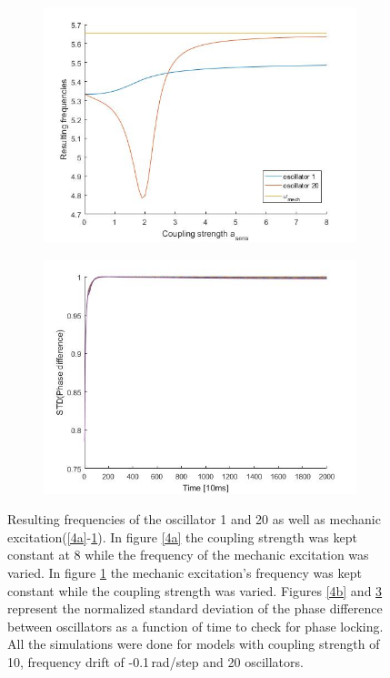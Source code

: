 \documentclass[a4paper]{scrartcl}
\begin{document}
\begin{figure}[t]
\begin{subfigure}[b]{0.49\textwidth}
		\includegraphics[width=\textwidth]{results/6.c/Freq_O_const.jpg}
		\caption{}\label{4c}
	\end{subfigure}
	\centering
	\begin{subfigure}[b]{0.49\textwidth}
		\centering
		\includegraphics[width=\textwidth]{results/6.c/Phase_O_const.jpg}
		\caption{}\label{4d}
	\end{subfigure}
	\caption{Resulting frequencies of the oscillator 1 and 20 as well as mechanic excitation(\ref{4a}-\ref{4c}). In figure \ref{4a} the coupling strength was kept constant at 8 while the frequency of the mechanic excitation was varied. In figure \ref{4c} the mechanic excitation's frequency was kept constant while the coupling strength was varied. Figures \ref{4b} and \ref{4d} represent the normalized standard deviation of the phase difference between oscillators as a function of time to check for phase locking. All the simulations were done for models with coupling strength of 10, frequency drift of -0.1\,rad/step and 20 oscillators.}
\end{figure}
\end{document}
